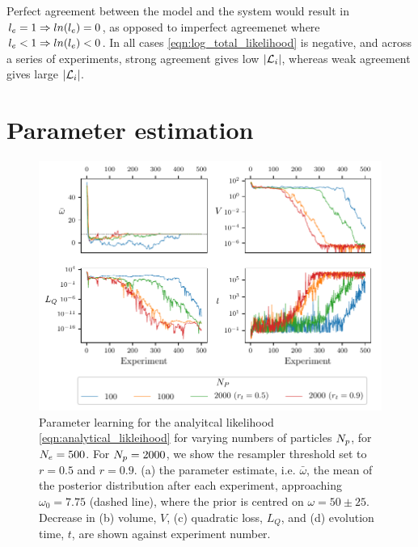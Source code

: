 Perfect agreement between the model and the system would result in $l_{e}=1 \Rightarrow ln(l_{e})=0$, 
    as opposed to imperfect agreemenet where $l_{e} < 1 \Rightarrow ln(l_{e}) < 0$.
In all cases \cref{eqn:log_total_likelihood} is negative, 
    and across a series of experiments,
    strong agreement gives low $\left| {\mathcal{L}}_{i} \right| $, 
    whereas weak agreement gives large $\left| {\mathcal{L}}_{i} \right| $. 


\section{Parameter estimation}

\begin{figure}[t]
    \centering
    \includegraphics{algorithms/figures/params.pdf}
    \caption[Parameter learning varying number of particles]{
        Parameter learning for the analyitcal \gls{likelihood} \cref{eqn:analytical_likleihood}
        for varying numbers of particles $N_p$, for $N_e=500$. 
        For $N_p=2000$, we show the resampler threshold set to $r=0.5$ and $r=0.9$. 
        (a) the parameter estimate, i.e. $\bar{\omega}$, the mean of the posterior distribution after each experiment, 
        approaching $\omega_0=7.75$ (dashed line), where the prior is centred on $\omega=50 \pm 25$. 
        Decrease in (b) volume, $V$, (c) quadratic loss, $L_Q$, 
        and (d) evolution time, $t$, are shown against experiment number.
        \figtableref
    }
    \label{fig:param_learning_vary_particles}
\end{figure}


